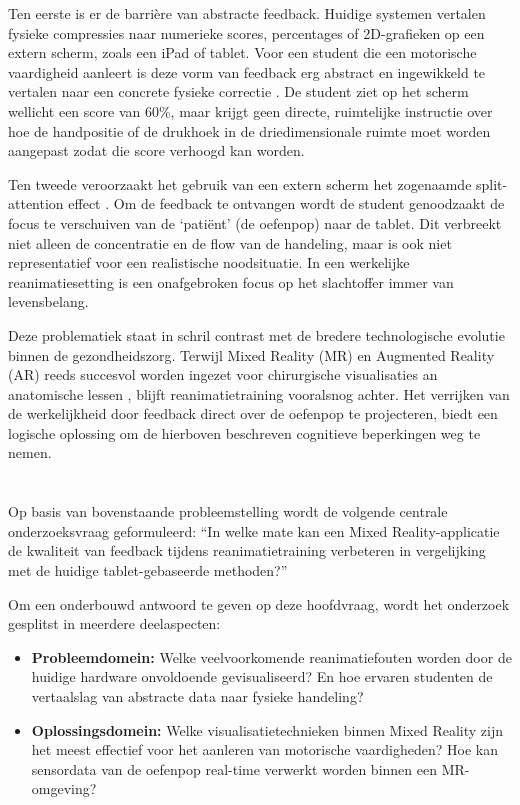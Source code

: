 Ten eerste is er de barrière van abstracte feedback. Huidige systemen vertalen fysieke compressies naar numerieke scores, 
percentages of 2D-grafieken op een extern scherm, zoals een iPad of tablet. Voor een student die een motorische vaardigheid 
aanleert is deze vorm van feedback erg abstract en ingewikkeld te vertalen naar een concrete fysieke correctie \textcite{Sigrist2013}. 
De student ziet op het scherm wellicht een score van 60\%, maar krijgt geen directe, ruimtelijke instructie over hoe de handpositie of 
de drukhoek in de driedimensionale ruimte moet worden aangepast zodat die score verhoogd kan worden. 

Ten tweede veroorzaakt het gebruik van een extern scherm het zogenaamde split-attention effect \textcite{Sigrist2013}. Om de feedback te ontvangen wordt de student genoodzaakt de focus te verschuiven van de ‘patiënt’ (de oefenpop) naar de tablet. Dit verbreekt niet alleen de concentratie en de flow van de handeling, maar is ook niet representatief voor een realistische noodsituatie. In een werkelijke reanimatiesetting is een onafgebroken focus op het slachtoffer immer van levensbelang.

Deze problematiek staat in schril contrast met de bredere technologische evolutie binnen de gezondheidszorg. Terwijl Mixed Reality (MR) en Augmented Reality (AR) reeds succesvol worden ingezet voor chirurgische visualisaties an anatomische lessen \autocite{DAngelo2021}, blijft reanimatietraining vooralsnog achter. Het verrijken van de werkelijkheid door feedback direct over de oefenpop te projecteren, biedt een logische oplossing om de hierboven beschreven cognitieve beperkingen weg te nemen.

\section{}%
\label{sec:onderzoeksvraag}

Op basis van bovenstaande probleemstelling wordt de volgende centrale onderzoeksvraag geformuleerd: “In welke mate kan een Mixed Reality-applicatie de kwaliteit van feedback tijdens reanimatietraining verbeteren in vergelijking met de huidige tablet-gebaseerde methoden?”

Om een onderbouwd antwoord te geven op deze hoofdvraag, wordt het onderzoek gesplitst in meerdere deelaspecten: 
\begin{itemize}
    \item \textbf{Probleemdomein:} Welke veelvoorkomende reanimatiefouten worden door de huidige hardware onvoldoende gevisualiseerd? En hoe ervaren studenten de vertaalslag van abstracte data naar fysieke handeling?
    \item \textbf{Oplossingsdomein:} Welke visualisatietechnieken binnen Mixed Reality zijn het meest effectief voor het aanleren van motorische vaardigheden? Hoe kan sensordata van de oefenpop real-time verwerkt worden binnen een MR-omgeving?
\end{itemize}

